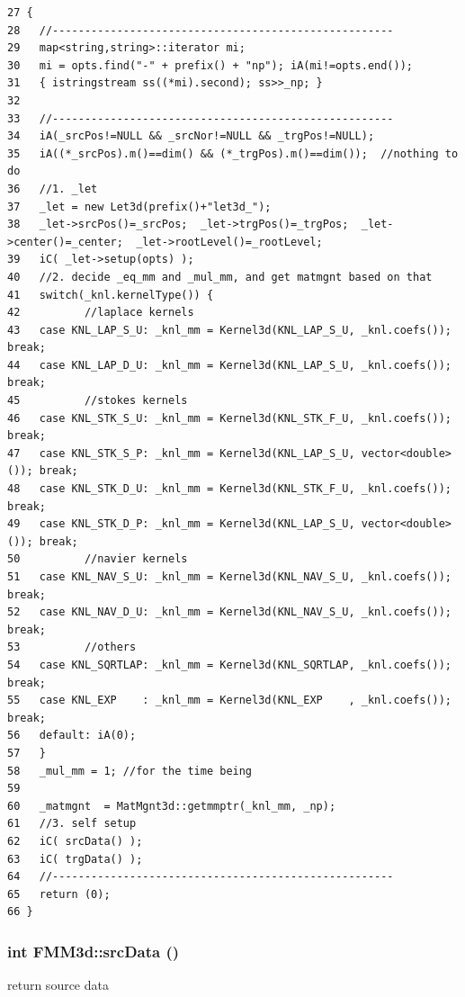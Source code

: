 \footnotesize\begin{verbatim}27 {
28   //-----------------------------------------------------
29   map<string,string>::iterator mi;
30   mi = opts.find("-" + prefix() + "np"); iA(mi!=opts.end());
31   { istringstream ss((*mi).second); ss>>_np; }
32     
33   //-----------------------------------------------------
34   iA(_srcPos!=NULL && _srcNor!=NULL && _trgPos!=NULL);
35   iA((*_srcPos).m()==dim() && (*_trgPos).m()==dim());  //nothing to do
36   //1. _let
37   _let = new Let3d(prefix()+"let3d_");
38   _let->srcPos()=_srcPos;  _let->trgPos()=_trgPos;  _let->center()=_center;  _let->rootLevel()=_rootLevel;
39   iC( _let->setup(opts) );
40   //2. decide _eq_mm and _mul_mm, and get matmgnt based on that
41   switch(_knl.kernelType()) {
42          //laplace kernels
43   case KNL_LAP_S_U: _knl_mm = Kernel3d(KNL_LAP_S_U, _knl.coefs()); break;
44   case KNL_LAP_D_U: _knl_mm = Kernel3d(KNL_LAP_S_U, _knl.coefs()); break;
45          //stokes kernels
46   case KNL_STK_S_U: _knl_mm = Kernel3d(KNL_STK_F_U, _knl.coefs()); break;
47   case KNL_STK_S_P: _knl_mm = Kernel3d(KNL_LAP_S_U, vector<double>()); break;
48   case KNL_STK_D_U: _knl_mm = Kernel3d(KNL_STK_F_U, _knl.coefs()); break;
49   case KNL_STK_D_P: _knl_mm = Kernel3d(KNL_LAP_S_U, vector<double>()); break;
50          //navier kernels
51   case KNL_NAV_S_U: _knl_mm = Kernel3d(KNL_NAV_S_U, _knl.coefs()); break;
52   case KNL_NAV_D_U: _knl_mm = Kernel3d(KNL_NAV_S_U, _knl.coefs()); break;
53          //others
54   case KNL_SQRTLAP: _knl_mm = Kernel3d(KNL_SQRTLAP, _knl.coefs()); break;
55   case KNL_EXP    : _knl_mm = Kernel3d(KNL_EXP    , _knl.coefs()); break;
56   default: iA(0);
57   }
58   _mul_mm = 1; //for the time being
59   
60   _matmgnt  = MatMgnt3d::getmmptr(_knl_mm, _np);
61   //3. self setup
62   iC( srcData() );
63   iC( trgData() );
64   //-----------------------------------------------------
65   return (0);
66 }
\end{verbatim}\normalsize 


\subsubsection{\setlength{\rightskip}{0pt plus 5cm}int FMM3d::src\-Data ()\hspace{0.3cm}{\tt  [protected]}}\label{classFMM3d_44ef9057a3adc0372c2569c172064dac_44ef9057a3adc0372c2569c172064dac}


return source data 

